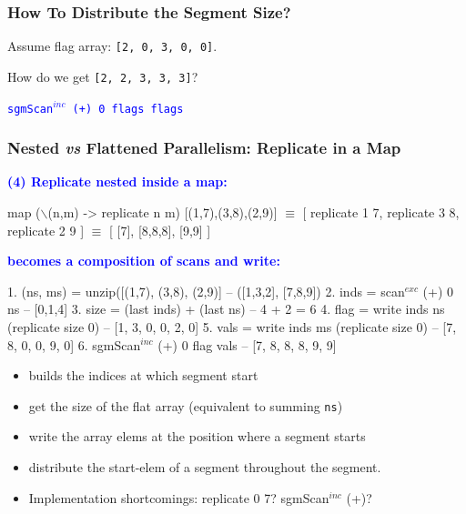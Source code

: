 \documentclass{beamer}
\newcommand{\blue}[1]{\textcolor{Blue}{{#1}}}
\renewcommand{\emph}[1]{\textcolor{structure}{#1}}
\newcommand{\emp}[1]{\textcolor{DikuRed}{ #1}}
\newcommand{\mymath}[1]{$ #1 $}
\newcommand{\myindu}[1]{^{#1}}
\begin{document}
\begin{frame}[fragile,t]
  \frametitle{How To Distribute the Segment Size?}

Assume flag array: \emph{\tt [2, 0, 3, 0, 0]}.

\bigskip

How do we get \emp{\tt [2, 2, 3, 3, 3]}?

\bigskip
\pause

\blue{\tt sgmScan\mymath{\myindu{inc}} (+) 0 flags flags}

\end{frame}


\begin{frame}[fragile,t]
  \frametitle{Nested {\it vs} Flattened Parallelism: Replicate in a Map}

\blue{\bf (4) Replicate nested inside a map:}

\begin{colorcode}[fontsize=\scriptsize]
map (\mymath{\backslash}(n,m) -> replicate n m) \emp{[(1,7),(3,8),(2,9)]} \mymath{\equiv}
[ replicate 1 7, replicate 3 8, replicate 2 9 ] \mymath{\equiv}
[ [7], [8,8,8], [9,9] ]
\end{colorcode}

\bigskip
\pause

\blue{\bf becomes a composition of scans and write:}
\bigskip

\begin{colorcode}[fontsize=\scriptsize]
1. (ns, ms)  = unzip([(1,7), (3,8), (2,9)]      -- ([1,3,2], [7,8,9])
2. inds = scan\mymath{\myindu{exc}} (+) 0 ns                       -- [0,1,4]
3. size = (last inds) + (last ns)               -- 4 + 2 = 6
4. flag = write inds  ns  (replicate size 0)    -- [1, 3, 0, 0, 2, 0]
5. vals = write inds  ms  (replicate size 0)    -- [7, 8, 0, 0, 9, 0]
6. sgmScan\mymath{\myindu{inc}} (+) 0 flag \emp{vals}                    \emph{-- [7, 8, 8, 8, 9, 9]}
\end{colorcode}

\bigskip

\begin{itemize}
    \item[2.] builds the indices at which segment start
    \item[3.] get the size of the flat array (equivalent to summing {\tt ns})
    \item[4-5.] write the array elems at the position where a segment starts
    \item[6.] distribute the start-elem of a segment throughout the segment. 
    \item \alert{Implementation shortcomings:} \pause replicate 0 7? \pause sgmScan\mymath{\myindu{inc}} (+)?
\end{itemize}

\end{frame}
\end{document}
